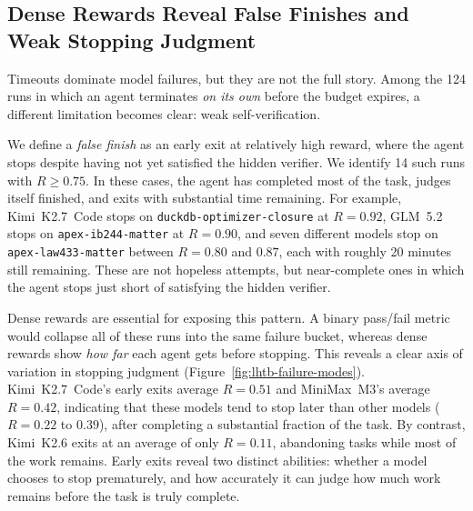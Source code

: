 

\subsection{Dense Rewards Reveal False Finishes and Weak Stopping Judgment}
\label{sec:analysis-false-finish}

Timeouts dominate model failures, but they are not the full story.
%
Among the 124 runs in which an agent terminates \emph{on its own} before the budget expires, a different limitation becomes clear: weak self-verification.

We define a \emph{false finish} as an early exit at relatively high reward, where the agent stops despite having not yet satisfied the hidden verifier.
%
We identify 14 such runs with $R \geq 0.75$.
In these cases, the agent has completed most of the task, judges itself finished, and exits with substantial time remaining.
For example, Kimi~K2.7~Code stops on \texttt{duckdb-optimizer-closure} at $R = 0.92$, GLM~5.2 stops on \texttt{apex-ib244-matter} at $R = 0.90$, and seven different models stop on \texttt{apex-law433-matter} between $R = 0.80$ and $0.87$, each with roughly 20 minutes still remaining.
%
These are not hopeless attempts, but near-complete ones in which the agent stops just short of satisfying the hidden verifier.

Dense rewards are essential for exposing this pattern.
%
A binary pass/fail metric would collapse all of these runs into the same failure bucket, whereas dense rewards show \emph{how far} each agent gets before stopping.
%
This reveals a clear axis of variation in stopping judgment (Figure~\ref{fig:lhtb-failure-modes}).
Kimi~K2.7~Code's early exits average $R = 0.51$ and MiniMax~M3's average $R = 0.42$, indicating that these models tend to stop later than other models ($R=0.22$ to $0.39$), after completing a substantial fraction of the task.
%
By contrast, Kimi~K2.6 exits at an average of only $R = 0.11$, abandoning tasks while most of the work remains.
%
Early exits reveal two distinct abilities: whether a model chooses to stop prematurely, and how accurately it can judge how much work remains before the task is truly complete.

